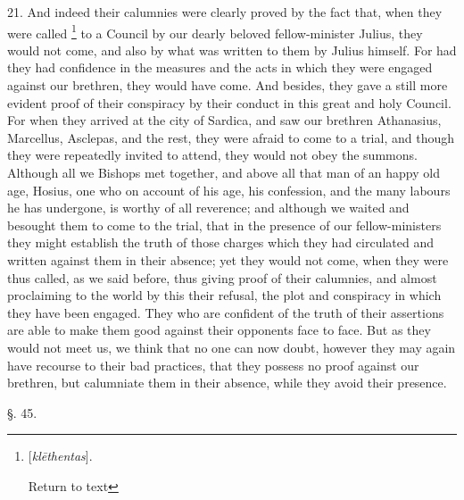 21. And indeed their calumnies were clearly
proved by the fact that, when they were called \footnote{[\emph{kl\={e}thentas}].

Return to text} to a Council
by our dearly beloved fellow-minister Julius, they would not come, and
also by what was written to them by Julius himself. For had they had
confidence in the measures and the acts in which they were engaged
against our brethren, they would have come. And besides, they gave a
still more evident proof of their conspiracy by their conduct in this
great and holy Council. For when they arrived at the city of Sardica,
and saw our brethren Athanasius, Marcellus, Asclepas, and the rest,
they were afraid to come to a trial, and though they were repeatedly
invited to attend, they would not obey the summons. Although all we
Bishops met together, and above all that man of an happy old age,
Hosius, one who on account of his age, his confession, and the many
labours he has undergone, is worthy of all reverence; and although we
waited and besought them to come to the trial, that in the presence of
our fellow-ministers they might establish the truth of those charges
which they had circulated and written against them in their absence;
yet they would not come, when they were thus called, as we said
before, thus giving proof of their calumnies, and almost proclaiming
to the world by this their refusal, the plot and conspiracy in which
they have been engaged. They who are confident of the truth of their
assertions are able to make them good against their opponents face to
face. But as they would not meet us, we think that no one can now
doubt, however they may again have recourse to their bad practices,
that they possess no proof against our brethren, but calumniate them
in their absence, while they avoid their presence.

§. 45.

